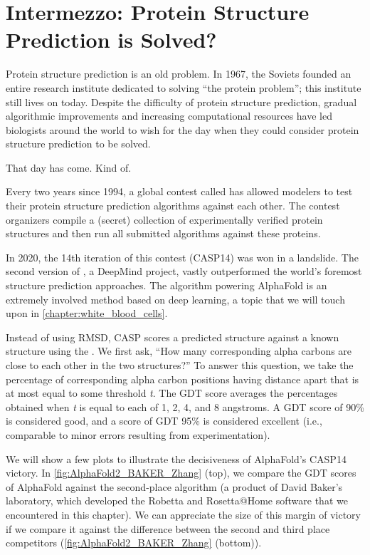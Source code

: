\FloatBarrier
{}

\section{Intermezzo: Protein Structure Prediction is Solved?}
\label{sec:conclusion_part_1}

Protein structure prediction is an old problem. In 1967, the Soviets founded an entire research institute dedicated to solving ``the protein problem''; this institute still lives on today. Despite the difficulty of protein structure prediction, gradual algorithmic improvements and increasing computational resources have led biologists around the world to wish for the day when they could consider protein structure prediction to be solved.

That day has come. Kind of.

Every two years since 1994, a global contest called  has allowed modelers to test their protein structure prediction algorithms against each other. The contest organizers compile a (secret) collection of experimentally verified protein structures and then run all submitted algorithms against these proteins.

In 2020, the 14th iteration of this contest (CASP14) was won in a landslide. The second version of \href{https://bit.ly/3sKl6pH}{}, a DeepMind project, vastly outperformed the world's foremost structure prediction approaches. The algorithm powering AlphaFold is an extremely involved method based on deep learning, a topic that we will touch upon in \autoref{chapter:white_blood_cells}.

Instead of using RMSD, CASP scores a predicted structure against a known structure using the . We first ask, ``How many corresponding alpha carbons are close to each other in the two structures?'' To answer this question, we take the percentage of corresponding alpha carbon positions having distance apart that is at most equal to some threshold \textit{t}. The GDT score averages the percentages obtained when \textit{t} is equal to each of 1, 2, 4, and 8 angstroms. A GDT score of 90\% is considered good, and a score of GDT 95\% is considered excellent (i.e., comparable to minor errors resulting from experimentation).

We will show a few plots to illustrate the decisiveness of AlphaFold's CASP14 victory. In \autoref{fig:AlphaFold2_BAKER_Zhang} (top), we compare the GDT scores of AlphaFold against the second-place algorithm (a product of David Baker's laboratory, which developed the Robetta and Rosetta@Home software that we encountered in this chapter). We can appreciate the size of this margin of victory if we compare it against the difference between the second and third place competitors (\autoref{fig:AlphaFold2_BAKER_Zhang} (bottom)).

